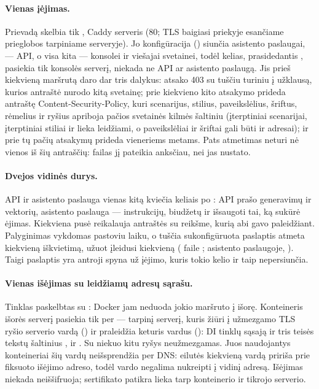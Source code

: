 \paragraph{Vienas įėjimas.} Prievadą skelbia tik , Caddy serveris
(80; TLS baigiasi priekyje esančiame prieglobos tarpiniame serveryje). Jo konfigūracija
()  siunčia asistento paslaugai, 
--- API, o visa kita --- konsolei ir viešajai svetainei, todėl kelias, prasidedantis
, pasiekia tik konsolės serverį, niekada ne API ar asistento paslaugą. Jis
prieš kiekvieną maršrutą daro dar tris dalykus: atsako 403 su tuščiu turiniu į užklausą,
kurios  antraštė nurodo kitą svetainę; prie kiekvieno kito atsakymo prideda antraštę
Content-Security-Policy, kuri
scenarijus, stilius, paveikslėlius, šriftus, rėmelius ir ryšius apriboja pačios svetainės
kilmės šaltiniu (įterptiniai scenarijai, įterptiniai stiliai ir  lieka leidžiami, o
paveikslėliai ir šriftai gali būti ir  adresai); ir prie tų pačių atsakymų prideda
 vieneriems metams. Pats atmetimas neturi nė vienos iš šių
antraščių: failas jį pateikia anksčiau, nei jas nustato.

\paragraph{Dvejos vidinės durys.} API ir asistento paslauga vienas kitą kviečia keliais po
: API prašo generavimų ir vektorių, asistento paslauga --- instrukcijų,
biudžetų ir išsaugoti tai, ką sukūrė ėjimas. Kiekviena pusė reikalauja antraštės
 su reikšme, kurią abi gavo paleidžiant. Palyginimas vykdomas
pastoviu laiku, o tuščia sukonfigūruota paslaptis atmeta kiekvieną iškvietimą, užuot
įleidusi kiekvieną ( faile ;
 asistento paslaugoje, ). Taigi paslaptis
yra antroji spyna už įėjimo, kuris tokio kelio ir taip nepersiunčia.

\paragraph{Vienas išėjimas su leidžiamų adresų sąrašu.} Tinklas  paskelbtas su
 : Docker jam neduoda jokio maršruto į išorę. Konteineris išorės
serverį pasiekia tik per  --- tarpinį serverį, kuris žiūri į
užmezgamo TLS ryšio serverio vardą () ir praleidžia keturis vardus
(): DI tinklų sąsają  ir tris teisės tekstų šaltinius
,  ir . Su niekuo kitu
ryšys neužmezgamas. Juos naudojantys konteineriai šių vardų neišsprendžia per DNS: eilutės
 kiekvieną vardą pririša prie fiksuoto išėjimo adreso, todėl vardo negalima
nukreipti į vidinį adresą. Išėjimas niekada neiššifruoja; sertifikato patikra lieka tarp
konteinerio ir tikrojo serverio.

